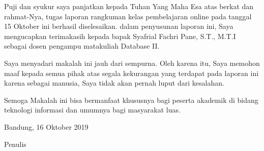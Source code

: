 \begin{acknowledgements}
Puji dan syukur saya panjatkan kepada Tuhan Yang Maha Esa atas berkat dan rahmat-Nya, tugas laporan rangkuman kelas pembelajaran online pada tanggal 15 Oktober ini berhasil diselesaikan. dalam penyusunan laporan ini, Saya mengucapkan terimakasih kepada bapak Syafrial Fachri Pane, S.T., M.T.I sebagai dosen pengampu matakuliah Database II.

Saya menyadari makalah ini jauh dari sempurna. Oleh karena itu, Saya memohon maaf kepada semua pihak atas segala kekurangan yang terdapat pada laporan ini karena sebagai manusia, Saya tidak akan pernah luput dari kesalahan. 

Semoga Makalah ini bisa bermanfaat khususnya bagi peserta akademik di bidang teknologi informasi dan umumnya bagi masyarakat luas. 

\begin{raggedleft}

Bandung, 16 Oktober 2019

Penulis

\end{raggedleft}

\end{acknowledgements}